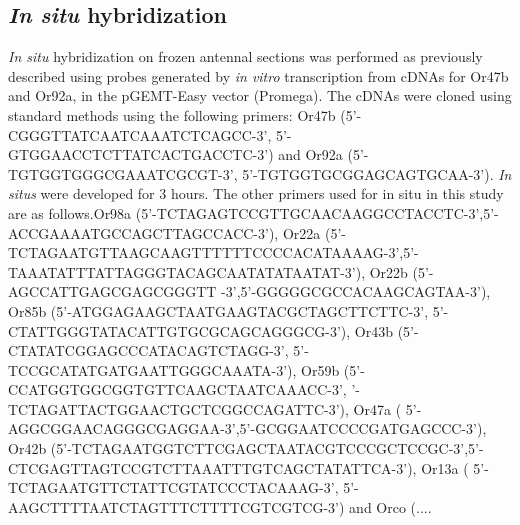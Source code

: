 \subsection*{\emph{In situ} hybridization}

\emph{In situ} hybridization on frozen antennal sections was performed as previously described \cite{ein_Morozov_Rzhetsky_Axel_1999} using probes generated by \emph{in vitro} transcription from cDNAs for Or47b and Or92a, in the pGEMT-Easy vector (Promega).
The cDNAs were cloned using standard methods using the following primers: Or47b (5'-CGGGTTATCAATCAAATCTCAGCC-3', 5'-GTGGAACCTCTTATCACTGACCTC-3') and Or92a (5'-TGTGGTGGGCGAAATCGCGT-3', 5'-TGTGGTGCGGAGCAGTGCAA-3').
\emph{In situs} were developed for 3 hours. The other primers used for in situ in this study are as follows.Or98a (5'-TCTAGAGTCCGTTGCAACAAGGCCTACCTC-3',5'-ACCGAAAATGCCAGCTTAGCCACC-3'), Or22a (5'-TCTAGAATGTTAAGCAAGTTTTTTCCCCACATAAAAG-3',5'-TAAATATTTATTAGGGTACAGCAATATATAATAT-3'), Or22b (5'-AGCCATTGAGCGAGCGGGTT -3',5'-GGGGGCGCCACAAGCAGTAA-3'), Or85b (5'-ATGGAGAAGCTAATGAAGTACGCTAGCTTCTTC-3', 5'-CTATTGGGTATACATTGTGCGCAGCAGGGCG-3'), Or43b (5'-CTATATCGGAGCCCATACAGTCTAGG-3', 5'-TCCGCATATGATGAATTGGGCAAATA-3'), Or59b (5'-CCATGGTGGCGGTGTTCAAGCTAATCAAACC-3', '-TCTAGATTACTGGAACTGCTCGGCCAGATTC-3'), Or47a ( 5'-AGGCGGAACAGGGCGAGGAA-3',5'-GCGGAATCCCCGATGAGCCC-3'), Or42b (5'-TCTAGAATGGTCTTCGAGCTAATACGTCCCGCTCCGC-3',5'-CTCGAGTTAGTCCGTCTTAAATTTGTCAGCTATATTCA-3'), Or13a ( 5'-TCTAGAATGTTCTATTCGTATCCCTACAAAG-3', 5'-AAGCTTTTAATCTAGTTTCTTTTCGTCGTCG-3') and Orco (.... 